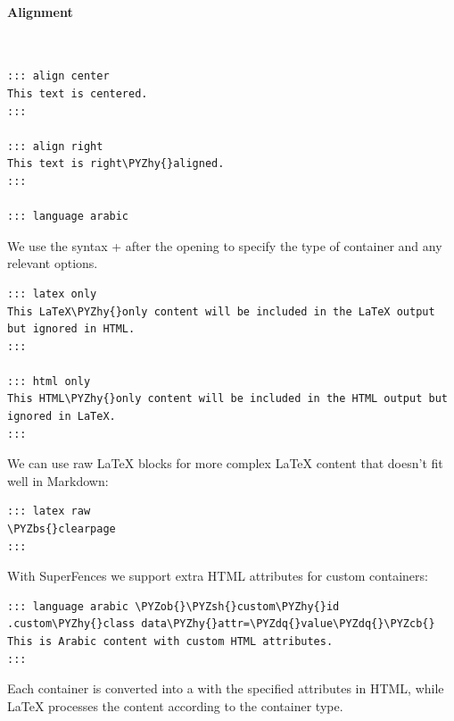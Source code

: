 \documentclass[a4paper,twoside]{article}
\begin{document}
\paragraph{Alignment}\mbox{}\\
\begin{tscode}[lang=text, engine=pygments]
\begin{Verbatim}[commandchars=\\\{\},breaklines, breakanywhere, commandchars=\\\{\}]
::: align center
This text is centered.
:::

::: align right
This text is right\PYZhy{}aligned.
:::

::: language arabic
\end{Verbatim}
\end{tscode}
We use the syntax  +  after the opening \tscodeinline{:::} to specify the type of container and any relevant options.
\begin{tscode}[lang=text, engine=pygments]
\begin{Verbatim}[commandchars=\\\{\},breaklines, breakanywhere, commandchars=\\\{\}]
::: latex only
This LaTeX\PYZhy{}only content will be included in the LaTeX output but ignored in HTML.
:::

::: html only
This HTML\PYZhy{}only content will be included in the HTML output but ignored in LaTeX.
:::
\end{Verbatim}
\end{tscode}
We can use raw \LaTeX{} blocks for more complex \LaTeX{} content that doesn't fit well in Markdown:
\begin{tscode}[lang=text, engine=pygments]
\begin{Verbatim}[commandchars=\\\{\},breaklines, breakanywhere, commandchars=\\\{\}]
::: latex raw
\PYZbs{}clearpage
:::
\end{Verbatim}
\end{tscode}
With SuperFences we support extra HTML attributes for custom containers:
\begin{tscode}[lang=text, engine=pygments]
\begin{Verbatim}[commandchars=\\\{\},breaklines, breakanywhere, commandchars=\\\{\}]
::: language arabic \PYZob{}\PYZsh{}custom\PYZhy{}id .custom\PYZhy{}class data\PYZhy{}attr=\PYZdq{}value\PYZdq{}\PYZcb{}
This is Arabic content with custom HTML attributes.
:::
\end{Verbatim}
\end{tscode}
Each \tscodeinline{:::} container is converted into a  with the specified attributes in HTML, while \LaTeX{} processes the content according to the container type.
\end{document}
